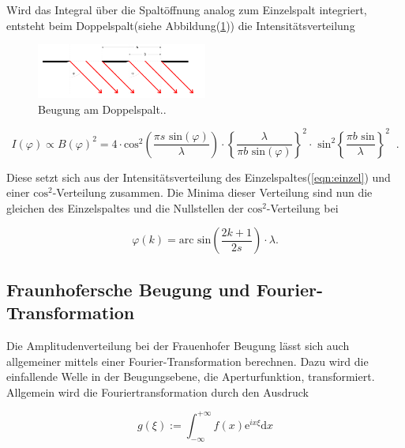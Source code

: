         \noindent Wird das Integral über die Spaltöffnung analog zum Einzelspalt integriert, entsteht beim 
        Doppelspalt(siehe Abbildung(\ref{img:Doppelspalt})) die Intensitätsverteilung

        \begin{figure}[ht]
            \centering
            \includegraphics[width=0.5\textwidth]{latex/images/Doppelspalt.PNG}
            \caption{Beugung am Doppelspalt.\protect \cite{V406}.}
            \label{img:Doppelspalt}
        \end{figure}

        \begin{equation}
            I(\varphi) \propto B(\varphi)^2 = 4 \cdot \text{cos}^2 \left( \frac{\pi s \text{ sin}(\varphi)}{\lambda} \right) \cdot 
            \left\{ \frac{\lambda}{\pi b \text{ sin}(\varphi)} \right\}^2 \cdot \text{ sin}^2 \left\{ \frac{ \pi b \text{ sin}}{\lambda} \right\}^2 \; \;.
        \end{equation}

        \noindent Diese setzt sich aus der Intensitätsverteilung des Einzelspaltes(\ref{eqn:einzel}) und einer $\text{cos}^2$-Verteilung zusammen. Die 
        Minima dieser Verteilung  sind nun die gleichen des Einzelspaltes und die Nullstellen der $\text{cos}^2$-Verteilung bei 

        \begin{equation*}
            \varphi(k) = \text{arc sin}\left( \frac{2k +1 }{2s} \right) \cdot \lambda .
        \end{equation*}

    \subsection{Fraunhofersche Beugung und Fourier-Transformation}

        \noindent Die Amplitudenverteilung bei der Frauenhofer Beugung lässt sich auch allgemeiner mittels einer Fourier-Transformation 
        berechnen. Dazu wird die einfallende Welle in der Beugungsebene, die Aperturfunktion, transformiert.\\
        Allgemein wird die Fouriertransformation durch den Ausdruck 

        \begin{equation}
            \label{eqn:Fourier}
            g(\xi) := \int_{-\infty}^{+\infty} f(x) \text{e}^{i x \xi} \text{d}x
        \end{equation}

